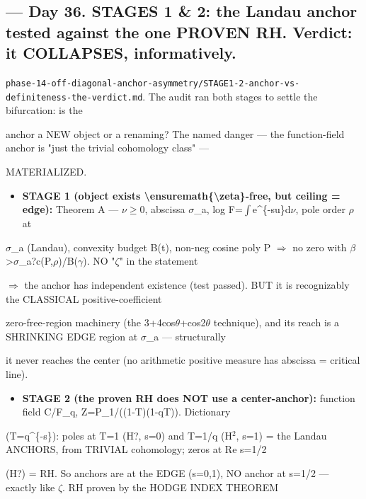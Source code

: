 \documentclass[10pt]{article}
\begin{document}
\subsection*{ --- Day 36. STAGES 1 \& 2: the Landau anchor tested against the one PROVEN RH. Verdict: it COLLAPSES, informatively.}
\texttt{phase-14-off-diagonal-anchor-asymmetry/STAGE1-2-anchor-vs-definiteness-the-verdict.md}. The audit ran both stages to settle the bifurcation: is the\par
anchor a NEW object or a renaming? The named danger --- the function-field anchor is "just the trivial cohomology class" ---\par
MATERIALIZED.\par
\begin{itemize}
\item \textbf{STAGE 1 (object exists \textbackslash{}ensuremath\{\textbackslash{}zeta\}-free, but ceiling = edge):} Theorem A --- \ensuremath{\nu}\ensuremath{\ge}0, abscissa \ensuremath{\sigma}\_a, log F=\ensuremath{\int}e\textasciicircum{}\{-su\}d\ensuremath{\nu}, pole order \ensuremath{\rho} at
\end{itemize}
  \ensuremath{\sigma}\_a (Landau), convexity budget B(t), non-neg cosine poly P \ensuremath{\Rightarrow} no zero with \ensuremath{\beta}>\ensuremath{\sigma}\_a?c(P,\ensuremath{\rho})/B(\ensuremath{\gamma}). NO "\ensuremath{\zeta}" in the statement\par
  \ensuremath{\Rightarrow} the anchor has independent existence (test passed). BUT it is recognizably the CLASSICAL positive-coefficient\par
  zero-free-region machinery (the 3+4cos\ensuremath{\theta}+cos2\ensuremath{\theta} technique), and its reach is a SHRINKING EDGE region at \ensuremath{\sigma}\_a --- structurally\par
  it never reaches the center (no arithmetic positive measure has abscissa = critical line).\par
\begin{itemize}
\item \textbf{STAGE 2 (the proven RH does NOT use a center-anchor):} function field C/F\_q, Z=P\_1/((1-T)(1-qT)). Dictionary
\end{itemize}
  (T=q\textasciicircum{}\{-s\}): poles at T=1 (H?, s=0) and T=1/q (H\ensuremath{^2}, s=1) = the Landau ANCHORS, from TRIVIAL cohomology; zeros at Re s=1/2\par
  (H?) = RH. So anchors are at the EDGE (s=0,1), NO anchor at s=1/2 --- exactly like \ensuremath{\zeta}. RH proven by the HODGE INDEX THEOREM\par
\end{document}
